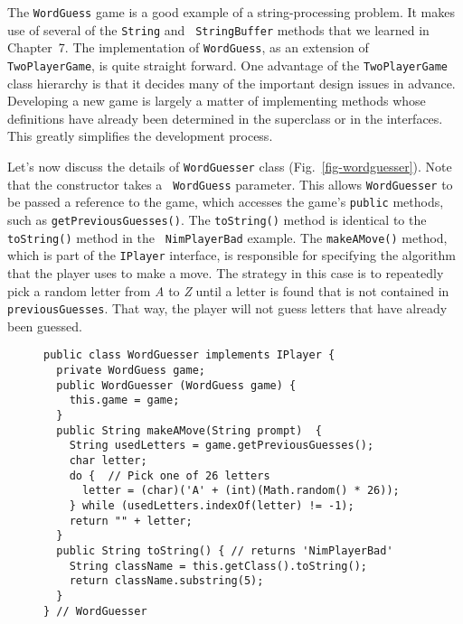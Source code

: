 The {\tt WordGuess} game is a good example of a string-processing
problem.  It makes use of several of the {\tt String} and {\tt
StringBuffer} methods that we learned in Chapter~7.  The
implementation of {\tt WordGuess}, as an extension of {\tt
TwoPlayerGame}, is quite straight forward. One advantage of
the {\tt TwoPlayerGame} class hierarchy is that it decides many
of the important design issues in advance. Developing a new game
is largely a matter of implementing methods whose definitions have
already been determined in the superclass or in the interfaces.  This
greatly simplifies the development process.

Let's now discuss the details of {\tt WordGuesser} class
(Fig.~\ref{fig-wordguesser}). Note that the constructor takes a {\tt
WordGuess} parameter. This allows {\tt WordGuesser} to be passed a
reference to the game, which accesses the game's {\tt public}
methods, such as {\tt getPreviousGuesses()}.  The {\tt toString()}
method is identical to the {\tt toString()} method in the {\tt
NimPlayerBad} example.  The {\tt makeAMove()} method, which is part of
the {\tt IPlayer} interface, is responsible for specifying the
algorithm that the player uses to make a move.  The strategy in this
case is to repeatedly pick a random letter from {\em A} to {\em Z}
until a letter is found that is not contained in {\tt
previousGuesses}.  That way, the player will not guess letters that
have already been guessed. 

\begin{figure}[t]
\jjjprogstart
\begin{jjjlisting}
\begin{lstlisting}
public class WordGuesser implements IPlayer {   
  private WordGuess game;
  public WordGuesser (WordGuess game) {   
    this.game = game;
  }
  public String makeAMove(String prompt)  {   
    String usedLetters = game.getPreviousGuesses();
    char letter;
    do {  // Pick one of 26 letters
      letter = (char)('A' + (int)(Math.random() * 26));
    } while (usedLetters.indexOf(letter) != -1);
    return "" + letter;
  }
  public String toString() { // returns 'NimPlayerBad'
    String className = this.getClass().toString(); 
    return className.substring(5);        
  }
} // WordGuesser
\end{lstlisting}
\end{jjjlisting}
\end{figure}

